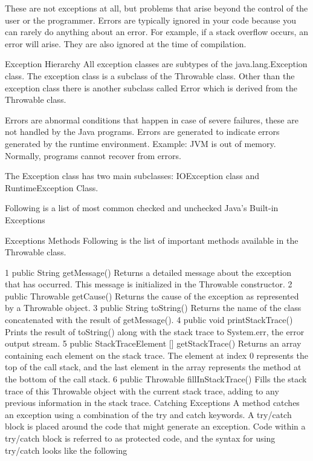 These are not exceptions at all, but problems that arise beyond the control of the user or the programmer. Errors are typically ignored in your code because you can rarely do anything about an error. For example, if a stack overflow occurs, an error will arise. They are also ignored at the time of compilation.

Exception Hierarchy
All exception classes are subtypes of the java.lang.Exception class. The exception class is a subclass of the Throwable class. Other than the exception class there is another subclass called Error which is derived from the Throwable class.

Errors are abnormal conditions that happen in case of severe failures, these are not handled by the Java programs. Errors are generated to indicate errors generated by the runtime environment. Example: JVM is out of memory. Normally, programs cannot recover from errors.

The Exception class has two main subclasses: IOException class and RuntimeException Class.



Following is a list of most common checked and unchecked Java's Built-in Exceptions

Exceptions Methods
Following is the list of important methods available in the Throwable class.

1	public String getMessage()
Returns a detailed message about the exception that has occurred. This message is initialized in the Throwable constructor.
2	public Throwable getCause()
Returns the cause of the exception as represented by a Throwable object.
3	public String toString()
Returns the name of the class concatenated with the result of getMessage().
4	public void printStackTrace()
Prints the result of toString() along with the stack trace to System.err, the error output stream.
5	public StackTraceElement [] getStackTrace()
Returns an array containing each element on the stack trace. The element at index 0 represents the top of the call stack, and the last element in the array represents the method at the bottom of the call stack.
6	public Throwable fillInStackTrace()
Fills the stack trace of this Throwable object with the current stack trace, adding to any previous information in the stack trace.
Catching Exceptions
A method catches an exception using a combination of the try and catch keywords. A try/catch block is placed around the code that might generate an exception. Code within a try/catch block is referred to as protected code, and the syntax for using try/catch looks like the following

